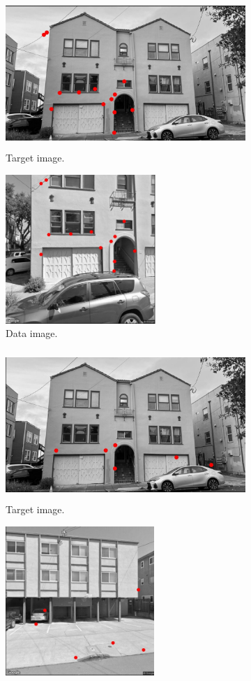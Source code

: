 \documentclass[10pt,twocolumn,letterpaper]{article}
\begin{document}
\begin{figure}
  \centering
  \begin{subfigure}{0.58\linewidth}
    \includegraphics[height=160pt]{fig/2.jpg}
    \caption{Target image.}
    \label{a}
  \end{subfigure}
  \begin{subfigure}{0.38\linewidth}
    \includegraphics[height=160pt]{fig/1.jpg}
    \caption{Data image.}
    \label{b}
  \end{subfigure}
  \begin{subfigure}{0.58\linewidth}
    \includegraphics[height=160pt]{fig/4.jpg}
    \caption{Target image.}
    \label{c}
  \end{subfigure}
  \begin{subfigure}{0.38\linewidth}
    \includegraphics[height=160pt]{fig/3.jpg}

\end{subfigure}
\end{figure}
\end{document}
